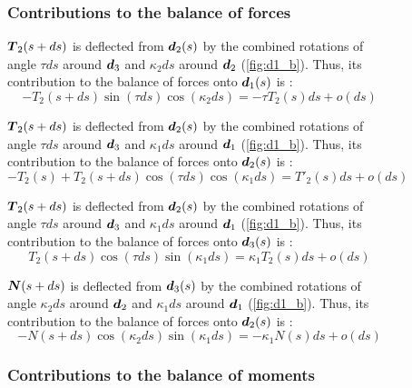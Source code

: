 \begin{figure}[p]
	\begin{fullpage}
	\subsubsection{Contributions to the balance of forces}
	\vspace{10pt}
	
	$\boldsymbol{T}_2(s+ds)$ is deflected from $\boldsymbol{d}_2(s)$ by the combined rotations of angle $\tau ds$ around $\boldsymbol{d}_3$ and $\kappa_2 ds$ around $\boldsymbol{d}_2$ (\cref{fig:d1_b}). Thus, its contribution to the balance of forces onto $\boldsymbol{d}_1(s)$ is : 
	\begin{equation*}
		-T_2(s+ds) \sin(\tau ds) \cos(\kappa_2 ds) = -\tau T_2(s) ds + o(ds)
	\end{equation*}	
	
	$\boldsymbol{T}_2(s+ds)$ is deflected from $\boldsymbol{d}_2(s)$ by the combined rotations of angle $\tau ds$ around $\boldsymbol{d}_3$ and $\kappa_1 ds$ around $\boldsymbol{d}_1$ (\cref{fig:d1_b}). Thus, its contribution to the balance of forces onto $\boldsymbol{d}_2(s)$ is : 
	\begin{equation*}
		-T_2(s) + T_2(s+ds) \cos(\tau ds) \cos(\kappa_1 ds) = T'_2 (s) ds + o(ds)
	\end{equation*}	
	
	$\boldsymbol{T}_2(s+ds)$ is deflected from $\boldsymbol{d}_2(s)$ by the combined rotations of angle $\tau ds$ around $\boldsymbol{d}_3$ and $\kappa_1 ds$ around $\boldsymbol{d}_1$ (\cref{fig:d1_b}). Thus, its contribution to the balance of forces onto $\boldsymbol{d}_3(s)$ is : 
	\begin{equation*}
		T_2(s+ds) \cos(\tau ds) \sin(\kappa_1 ds) = \kappa_1 T_2(s) ds + o(ds)
	\end{equation*}
		
	$\boldsymbol{N}(s+ds)$ is deflected from $\boldsymbol{d}_3(s)$ by the combined rotations of angle $\kappa_2 ds$ around $\boldsymbol{d}_2$ and $\kappa_1 ds$ around $\boldsymbol{d}_1$ (\cref{fig:d1_b}). Thus, its contribution to the balance of forces onto $\boldsymbol{d}_2(s)$ is : 
	\begin{equation*}
		-N(s+ds) \cos(\kappa_2 ds) \sin(\kappa_1 ds) = -\kappa_1 N(s) ds + o(ds)
	\end{equation*}	
	\vspace{10pt}

	\subsubsection{Contributions to the balance of moments}
	\vspace{10pt}
	

\end{fullpage}
\end{figure}
